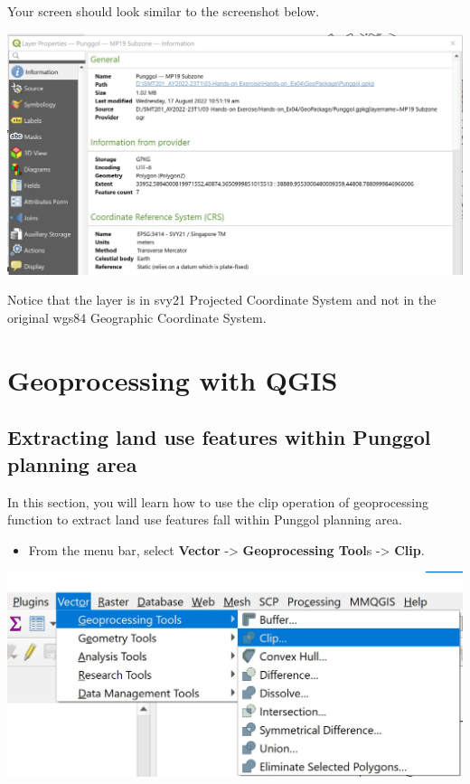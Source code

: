 \documentclass[
  letterpaper,
  DIV=11,
  numbers=noendperiod]{scrreprt}
\providecommand{\tightlist}{%
  \setlength{\itemsep}{0pt}\setlength{\parskip}{0pt}}\usepackage{longtable,booktabs,array}
\begin{document}
Your screen should look similar to the screenshot below.

\includegraphics{./img04/image20.jpg}

Notice that the layer is in svy21 Projected Coordinate System and not in
the original wgs84 Geographic Coordinate System.

\hypertarget{geoprocessing-with-qgis}{%
\section{Geoprocessing with QGIS}\label{geoprocessing-with-qgis}}

\hypertarget{extracting-land-use-features-within-punggol-planning-area}{%
\subsection{Extracting land use features within Punggol planning
area}\label{extracting-land-use-features-within-punggol-planning-area}}

In this section, you will learn how to use the clip operation of
geoprocessing function to extract land use features fall within Punggol
planning area.

\begin{itemize}
\tightlist
\item
  From the menu bar, select \textbf{Vector} -\textgreater{}
  \textbf{Geoprocessing Tool}s -\textgreater{} \textbf{Clip}.
\end{itemize}

\includegraphics{./img04/image21.jpg}
\end{document}
